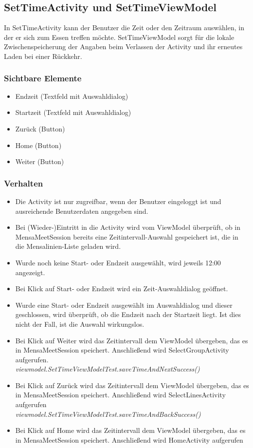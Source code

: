 \documentclass[a4paper]{scrreprt}
\begin{document}
\subsection{SetTimeActivity und SetTimeViewModel}
In SetTimeActivity kann der Benutzer die Zeit oder den Zeitraum auswählen, in der er sich zum Essen treffen möchte. SetTimeViewModel sorgt für die lokale Zwischenspeicherung der Angaben beim Verlassen der Activity und ihr erneutes Laden bei einer Rückkehr.

\subsubsection{Sichtbare Elemente}
\begin{itemize}
\item Endzeit (Textfeld mit Auswahldialog)
\item Startzeit (Textfeld mit Auswahldialog)
\item Zurück (Button) 
\item Home (Button) 
\item Weiter (Button) 
\end{itemize}

\subsubsection{Verhalten}
\begin{itemize}
\item Die Activity ist nur zugreifbar, wenn der Benutzer eingeloggt ist und ausreichende Benutzerdaten angegeben sind.
\item Bei (Wieder-)Eintritt in die Activity wird vom ViewModel überprüft, ob in MensaMeetSession bereits eine Zeitintervall-Auswahl gespeichert ist, die in die Mensalinien-Liste geladen wird.
\item Wurde noch keine Start- oder Endzeit ausgewählt, wird jeweils 12:00 angezeigt.
\item Bei Klick auf Start- oder Endzeit wird ein Zeit-Auswahldialog geöffnet.
\item Wurde eine Start- oder Endzeit ausgewählt im Auswahldialog und dieser geschlossen, wird überprüft, ob die Endzeit nach der Startzeit liegt. Ist dies nicht der Fall, ist die Auswahl wirkungslos. 
\item Bei Klick auf Weiter wird das Zeitintervall dem ViewModel übergeben, das es in MensaMeetSession speichert. Anschließend wird SelectGroupActivity aufgerufen.\\
\textit{viewmodel.SetTimeViewModelTest.saveTimeAndNextSuccess()}
\item Bei Klick auf Zurück wird das Zeitintervall dem ViewModel übergeben, das es in MensaMeetSession speichert. Anschließend wird SelectLinesActivity aufgerufen\\
\textit{viewmodel.SetTimeViewModelTest.saveTimeAndBackSuccess()}
\item Bei Klick auf Home wird das Zeitintervall dem ViewModel übergeben, das es in MensaMeetSession speichert. Anschließend wird HomeActivity aufgerufen
\end{itemize}
\end{document}
